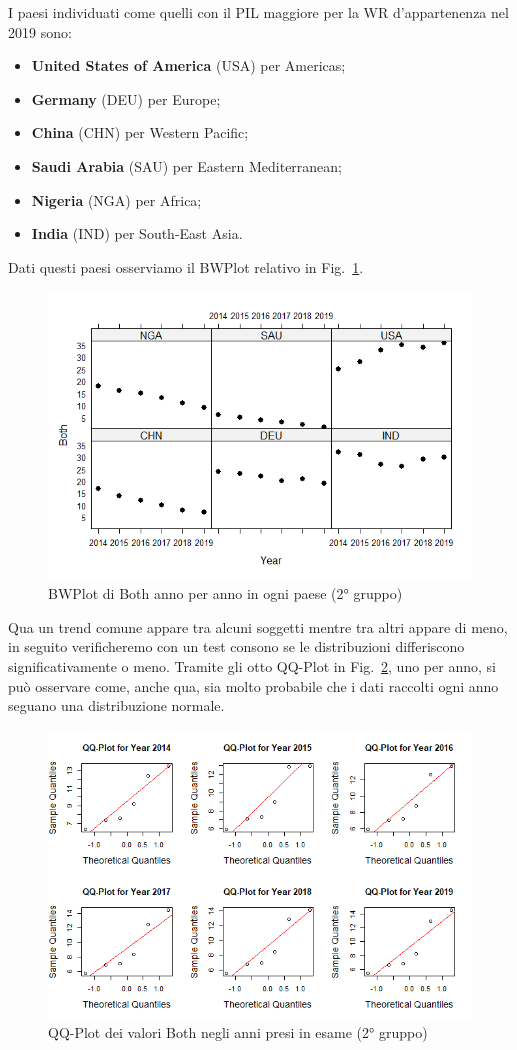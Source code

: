 \documentclass[conference]{IEEEtran}
\begin{document}
I paesi individuati come quelli con il PIL maggiore \cite{b6} per la WR
d'appartenenza nel 2019 sono:
\begin{itemize}
    \item \textbf{United States of America} (USA) per Americas;
    \item \textbf{Germany} (DEU) per Europe;
    \item \textbf{China} (CHN) per Western Pacific;
    \item \textbf{Saudi Arabia} (SAU) per Eastern Mediterranean;
    \item \textbf{Nigeria} (NGA) per Africa;
    \item \textbf{India} (IND) per South-East Asia. 
\end{itemize}
Dati questi paesi osserviamo il BWPlot relativo in Fig.~\ref{7secondgroup}.
\begin{figure}[htbp]
    \centerline{\includegraphics[width=.5\textwidth]{img/7 - Secondgroup.png}}
    \caption{BWPlot di Both anno per anno in ogni paese (2° gruppo)}
    \label{7secondgroup}
\end{figure}
Qua un trend comune appare tra alcuni soggetti mentre tra altri appare di meno,
in seguito verificheremo con un test consono se le distribuzioni differiscono significativamente o meno.
Tramite gli otto QQ-Plot in Fig.~\ref{8secondqq}, uno per anno, si può osservare come, anche qua,
sia molto probabile che i dati raccolti ogni anno seguano una distribuzione normale.
\begin{figure}[htbp]
    \centerline{\includegraphics[width=.5\textwidth]{img/8 - Secondqq.png}}
    \caption{QQ-Plot dei valori Both negli anni presi in esame (2° gruppo)}
    \label{8secondqq}
\end{figure}
\end{document}
